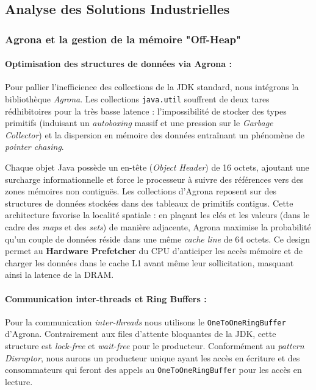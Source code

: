 \subsection{Analyse des Solutions Industrielles}

\subsubsection{Agrona et la gestion de la mémoire "Off-Heap"}

\paragraph{Optimisation des structures de données via Agrona :}

Pour pallier l'inefficience des collections de la JDK standard, nous intégrons la bibliothèque \textit{Agrona}. Les collections \texttt{java.util} souffrent de deux tares rédhibitoires pour la très basse latence : l'impossibilité de stocker des types primitifs (induisant un \textit{autoboxing} massif et une pression sur le \textit{Garbage Collector}) et la dispersion en mémoire des données entraînant un phénomène de \textit{pointer chasing}.

Chaque objet Java possède un en-tête (\textit{Object Header}) de 16 octets, ajoutant une surcharge informationnelle et force le processeur à suivre des références vers des zones mémoires non contiguës. Les collections d'Agrona reposent sur des structures de données stockées dans des tableaux de primitifs contigus. Cette architecture favorise la localité spatiale : en plaçant les clés et les valeurs (dans le cadre des \textit{maps} et des \textit{sets}) de manière adjacente, Agrona maximise la probabilité qu'un couple de données réside dans une même \textit{cache line} de 64 octets. Ce design permet au \textbf{Hardware Prefetcher} du CPU d'anticiper les accès mémoire et de charger les données dans le cache L1 avant même leur sollicitation, masquant ainsi la latence de la DRAM.

\paragraph{Communication inter-threads et Ring Buffers :}

Pour la communication \textit{inter-threads} nous utilisons le \texttt{OneToOneRingBuffer} d'Agrona. Contrairement aux files d'attente bloquantes de la JDK, cette structure est \textit{lock-free} et \textit{wait-free} pour le producteur. Conformément au \textit{pattern Disruptor}, nous aurons un producteur unique ayant les accès en écriture et des consommateurs qui feront des appels au \texttt{OneToOneRingBuffer} pour les accès en lecture. 

